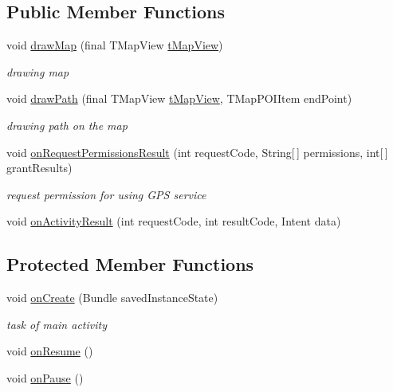 \subsection*{Public Member Functions}
\begin{DoxyCompactItemize}
\item 
void \mbox{\hyperlink{classhi_1_1world_1_1hello_1_1myapplication_1_1_main_activity_a4cfdda15f5eaaedf6c608758b6c07259}{draw\+Map}} (final T\+Map\+View \mbox{\hyperlink{classhi_1_1world_1_1hello_1_1myapplication_1_1_main_activity_a99006b1a0a4da0f230364e38d46f1741}{t\+Map\+View}})
\begin{DoxyCompactList}\small\item\em drawing map \end{DoxyCompactList}\item 
void \mbox{\hyperlink{classhi_1_1world_1_1hello_1_1myapplication_1_1_main_activity_ad6e4c482ccc7d1630168ed10874a26e7}{draw\+Path}} (final T\+Map\+View \mbox{\hyperlink{classhi_1_1world_1_1hello_1_1myapplication_1_1_main_activity_a99006b1a0a4da0f230364e38d46f1741}{t\+Map\+View}}, T\+Map\+P\+O\+I\+Item end\+Point)
\begin{DoxyCompactList}\small\item\em drawing path on the map \end{DoxyCompactList}\item 
void \mbox{\hyperlink{classhi_1_1world_1_1hello_1_1myapplication_1_1_main_activity_af417904ad04d6a619d2d316cc44a10fa}{on\+Request\+Permissions\+Result}} (int request\+Code, String\mbox{[}$\,$\mbox{]} permissions, int\mbox{[}$\,$\mbox{]} grant\+Results)
\begin{DoxyCompactList}\small\item\em request permission for using G\+PS service \end{DoxyCompactList}\item 
void \mbox{\hyperlink{classhi_1_1world_1_1hello_1_1myapplication_1_1_main_activity_afd40457c607c0d0a2ce8be1dded4e353}{on\+Activity\+Result}} (int request\+Code, int result\+Code, Intent data)
\end{DoxyCompactItemize}
\subsection*{Protected Member Functions}
\begin{DoxyCompactItemize}
\item 
void \mbox{\hyperlink{classhi_1_1world_1_1hello_1_1myapplication_1_1_main_activity_a523dacc03cb2b1c15df92e3a4eb2eb88}{on\+Create}} (Bundle saved\+Instance\+State)
\begin{DoxyCompactList}\small\item\em task of main activity \end{DoxyCompactList}\item 
void \mbox{\hyperlink{classhi_1_1world_1_1hello_1_1myapplication_1_1_main_activity_a07ccdceaee43aed9bc87992b194e00dc}{on\+Resume}} ()
\item 
void \mbox{\hyperlink{classhi_1_1world_1_1hello_1_1myapplication_1_1_main_activity_af7f83474172a1a1d570d948bbd90ae71}{on\+Pause}} ()
\end{DoxyCompactItemize}
